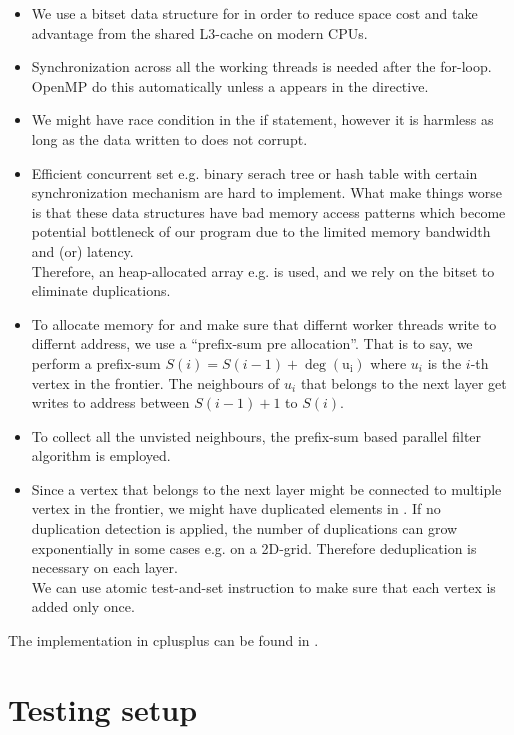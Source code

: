 \documentclass{article}
\newcommand{\reportSection}[1]{
   \section{#1}
   \rhead{section \emph{#1}}
}
\begin{document}
\begin{itemize}
	\item We use a bitset data structure for  in order to reduce space cost and take advantage from the shared L3-cache on modern CPUs.
	\item Synchronization across all the working threads is needed after the for-loop. OpenMP do this automatically unless a  appears in the  directive.
	\item We might have race condition in the if statement, however it is harmless as long as the data written to  does not corrupt.
	\item Efficient concurrent set e.g. binary serach tree or hash table with certain synchronization mechanism are hard to implement.
	      What make things worse is that these data structures have bad memory access patterns which become potential bottleneck of our program due to the limited memory bandwidth and (or) latency.\\
	      Therefore, an heap-allocated array e.g.  is used, and we rely on the  bitset to eliminate duplications.
	\item To allocate memory for  and make sure that differnt worker threads write to differnt address, we use a ``prefix-sum pre allocation''.
	      That is to say, we perform a prefix-sum $S(i)=S(i-1)+\deg(\mathrm{u_i})$ where $u_i$ is the $i$-th vertex in the frontier.
	      The neighbours of $u_i$ that belongs to the next layer get writes to address between $S(i-1)+1$ to $S(i)$.
	\item To collect all the unvisted neighbours, the prefix-sum based parallel filter algorithm is employed.
	\item Since a vertex that belongs to the next layer might be connected to multiple vertex in the frontier, we might have duplicated elements in .
	      If no duplication detection is applied, the number of duplications can grow exponentially in some cases e.g. on a 2D-grid.
	      Therefore deduplication is necessary on each layer.\\
	      We can use atomic test-and-set instruction to make sure that each vertex is added only once.
\end{itemize}

The implementation in cplusplus can be found in .

\reportSection{Testing setup}
\end{document}

